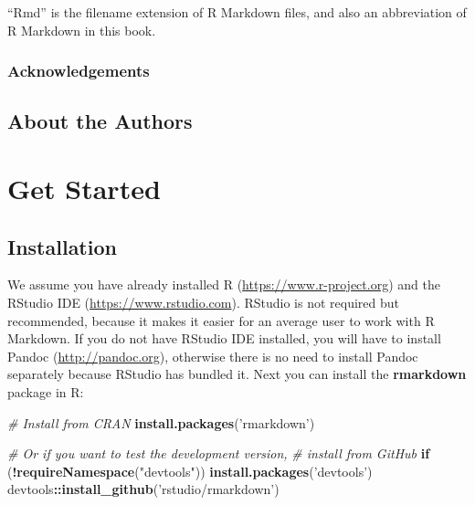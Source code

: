 \documentclass[]{book}
\newenvironment{Shaded}{\begin{snugshade}}{\end{snugshade}}
\newcommand{\KeywordTok}[1]{\textcolor[rgb]{0.13,0.29,0.53}{\textbf{#1}}}
\newcommand{\StringTok}[1]{\textcolor[rgb]{0.31,0.60,0.02}{#1}}
\newcommand{\CommentTok}[1]{\textcolor[rgb]{0.56,0.35,0.01}{\textit{#1}}}
\newcommand{\ControlFlowTok}[1]{\textcolor[rgb]{0.13,0.29,0.53}{\textbf{#1}}}
\newcommand{\OperatorTok}[1]{\textcolor[rgb]{0.81,0.36,0.00}{\textbf{#1}}}
\newcommand{\NormalTok}[1]{#1}
\begin{document}
``Rmd'' is the filename extension of R Markdown files, and also an
abbreviation of R Markdown in this book.

\section*{Acknowledgements}\label{acknowledgements}

\chapter*{About the Authors}\label{author}

\mainmatter

\part{Get Started}\label{part-get-started}

\chapter{Installation}\label{installation}

We assume you have already installed R (\url{https://www.r-project.org})
\citep{R-base} and the RStudio IDE (\url{https://www.rstudio.com}).
RStudio is not required but recommended, because it makes it easier for
an average user to work with R Markdown. If you do not have RStudio IDE
installed, you will have to install Pandoc
(\url{http://pandoc.org}), otherwise there is no need to install Pandoc
separately because RStudio has bundled it. Next you can install the
\textbf{rmarkdown} package in R:

\begin{Shaded}
\begin{Highlighting}[]
\CommentTok{# Install from CRAN}
\KeywordTok{install.packages}\NormalTok{(}\StringTok{'rmarkdown'}\NormalTok{)}

\CommentTok{# Or if you want to test the development version,}
\CommentTok{# install from GitHub}
\ControlFlowTok{if}\NormalTok{ (}\OperatorTok{!}\KeywordTok{requireNamespace}\NormalTok{(}\StringTok{"devtools"}\NormalTok{))}
  \KeywordTok{install.packages}\NormalTok{(}\StringTok{'devtools'}\NormalTok{)}
\NormalTok{devtools}\OperatorTok{::}\KeywordTok{install_github}\NormalTok{(}\StringTok{'rstudio/rmarkdown'}\NormalTok{)}
\end{Highlighting}
\end{Shaded}
\end{document}
